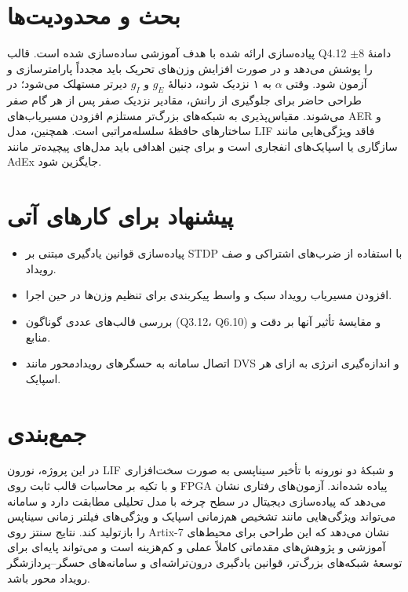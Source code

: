 \documentclass[12pt,a4paper]{article}
\begin{document}
\section{بحث و محدودیت‌ها}
پیاده‌سازی ارائه شده با هدف آموزشی ساده‌سازی شده است. قالب Q4.12 دامنهٔ $\pm8$ را پوشش می‌دهد و در صورت افزایش وزن‌های تحریک باید مجدداً پارامترسازی و آزمون شود. وقتی $\alpha$ به ۱ نزدیک شود، دنبالهٔ $g_E$ و $g_I$ دیرتر مستهلک می‌شود؛ در طراحی حاضر برای جلوگیری از رانش، مقادیر نزدیک صفر پس از هر گام صفر می‌شوند. مقیاس‌پذیری به شبکه‌های بزرگ‌تر مستلزم افزودن مسیریاب‌های AER و ساختارهای حافظهٔ سلسله‌مراتبی است. همچنین، مدل LIF فاقد ویژگی‌هایی مانند سازگاری یا اسپایک‌های انفجاری است و برای چنین اهدافی باید مدل‌های پیچیده‌تر مانند AdEx جایگزین شود.

\section{پیشنهاد برای کارهای آتی}
\begin{itemize}
  \item پیاده‌سازی قوانین یادگیری مبتنی بر STDP با استفاده از ضرب‌های اشتراکی و صف رویداد.
  \item افزودن مسیریاب رویداد سبک و واسط پیکربندی برای تنظیم وزن‌ها در حین اجرا.
  \item بررسی قالب‌های عددی گوناگون (Q3.12، Q6.10) و مقایسهٔ تأثیر آنها بر دقت و منابع.
  \item اتصال سامانه به حسگرهای رویدادمحور مانند DVS و اندازه‌گیری انرژی به ازای هر اسپایک.
\end{itemize}

\section{جمع‌بندی}
در این پروژه، نورون LIF و شبکهٔ دو نورونه با تأخیر سیناپسی به صورت سخت‌افزاری و با تکیه بر محاسبات قالب ثابت روی FPGA پیاده شده‌اند. آزمون‌های رفتاری نشان می‌دهد که پیاده‌سازی دیجیتال در سطح چرخه با مدل تحلیلی مطابقت دارد و سامانه می‌تواند ویژگی‌هایی مانند تشخیص هم‌زمانی اسپایک و ویژگی‌های فیلتر زمانی سیناپس را بازتولید کند. نتایج سنتز روی Artix-7 نشان می‌دهد که این طراحی برای محیط‌های آموزشی و پژوهش‌های مقدماتی کاملاً عملی و کم‌هزینه است و می‌تواند پایه‌ای برای توسعهٔ شبکه‌های بزرگ‌تر، قوانین یادگیری درون‌تراشه‌ای و سامانه‌های حسگر–پردازشگر رویداد محور باشد.
\end{document}
